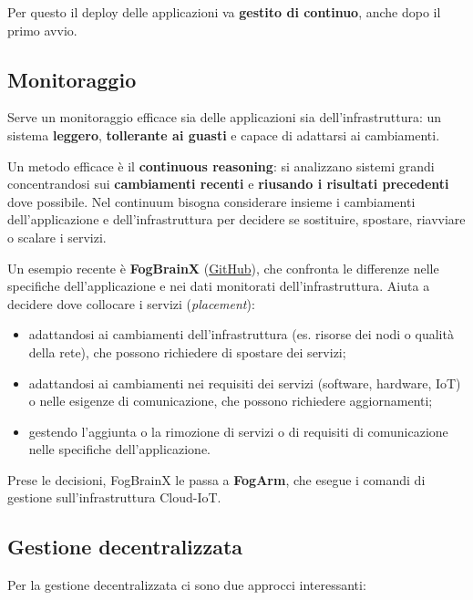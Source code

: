 Per questo il deploy delle applicazioni va \textbf{gestito di continuo},
anche dopo il primo avvio.

\subsection{Monitoraggio}\label{monitoraggio}

Serve un monitoraggio efficace sia delle applicazioni sia
dell'infrastruttura: un sistema \textbf{leggero}, \textbf{tollerante ai
guasti} e capace di adattarsi ai cambiamenti.

Un metodo efficace è il \textbf{continuous reasoning}: si analizzano
sistemi grandi concentrandosi sui \textbf{cambiamenti recenti} e
\textbf{riusando i risultati precedenti} dove possibile. Nel continuum
bisogna considerare insieme i cambiamenti dell'applicazione e
dell'infrastruttura per decidere se sostituire, spostare, riavviare o
scalare i servizi.

Un esempio recente è \textbf{FogBrainX}
(\href{https://github.com/di-unipi-socc/fogbrainx}{GitHub}), che
confronta le differenze nelle specifiche dell'applicazione e nei dati
monitorati dell'infrastruttura. Aiuta a decidere dove collocare i
servizi (\emph{placement}):

\begin{itemize}
\tightlist
\item
  adattandosi ai cambiamenti dell'infrastruttura (es. risorse dei nodi o
  qualità della rete), che possono richiedere di spostare dei servizi;
\item
  adattandosi ai cambiamenti nei requisiti dei servizi (software,
  hardware, IoT) o nelle esigenze di comunicazione, che possono
  richiedere aggiornamenti;
\item
  gestendo l'aggiunta o la rimozione di servizi o di requisiti di
  comunicazione nelle specifiche dell'applicazione.
\end{itemize}

Prese le decisioni, FogBrainX le passa a \textbf{FogArm}, che esegue i
comandi di gestione sull'infrastruttura Cloud-IoT.

\subsection{Gestione decentralizzata}\label{gestione-decentralizzata}

Per la gestione decentralizzata ci sono due approcci interessanti:

